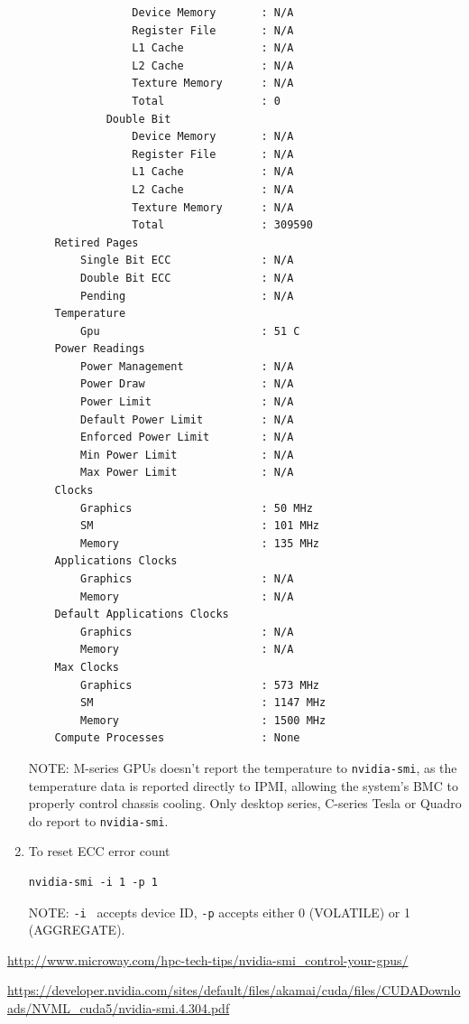 \begin{enumerate}
\begin{verbatim}
                Device Memory       : N/A
                Register File       : N/A
                L1 Cache            : N/A
                L2 Cache            : N/A
                Texture Memory      : N/A
                Total               : 0
            Double Bit            
                Device Memory       : N/A
                Register File       : N/A
                L1 Cache            : N/A
                L2 Cache            : N/A
                Texture Memory      : N/A
                Total               : 309590
    Retired Pages
        Single Bit ECC              : N/A
        Double Bit ECC              : N/A
        Pending                     : N/A
    Temperature
        Gpu                         : 51 C
    Power Readings
        Power Management            : N/A
        Power Draw                  : N/A
        Power Limit                 : N/A
        Default Power Limit         : N/A
        Enforced Power Limit        : N/A
        Min Power Limit             : N/A
        Max Power Limit             : N/A
    Clocks
        Graphics                    : 50 MHz
        SM                          : 101 MHz
        Memory                      : 135 MHz
    Applications Clocks
        Graphics                    : N/A
        Memory                      : N/A
    Default Applications Clocks
        Graphics                    : N/A
        Memory                      : N/A
    Max Clocks
        Graphics                    : 573 MHz
        SM                          : 1147 MHz
        Memory                      : 1500 MHz
    Compute Processes               : None
\end{verbatim} 

NOTE: M-series GPUs doesn't report the temperature to \verb!nvidia-smi!, as the
temperature data is reported directly to IPMI, allowing the system's BMC to
properly control chassis cooling. Only desktop series, C-series Tesla or Quadro
do report to \verb!nvidia-smi!.

  \item To reset ECC error count
\begin{verbatim}
nvidia-smi -i 1 -p 1 
\end{verbatim} 
NOTE: \verb!-i ! accepts device ID, \verb!-p! accepts either 0 (VOLATILE) or 1
(AGGREGATE).

\end{enumerate} 
\url{http://www.microway.com/hpc-tech-tips/nvidia-smi_control-your-gpus/}

\url{https://developer.nvidia.com/sites/default/files/akamai/cuda/files/CUDADownloads/NVML_cuda5/nvidia-smi.4.304.pdf}


